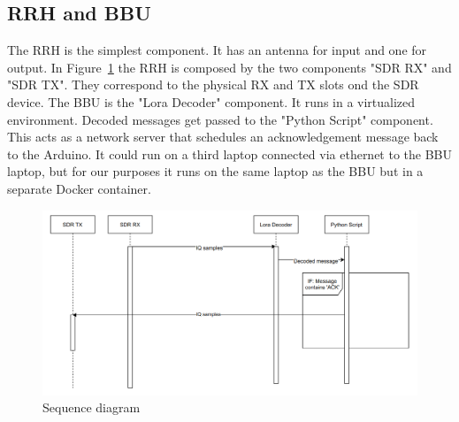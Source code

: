\subsection{RRH and BBU}
The RRH is the simplest component. It has an antenna for input and one for output. In Figure~\ref{fig:seq_diagram} the RRH is composed by the two 
components "SDR RX" and "SDR TX". They correspond to the physical RX and TX slots ond the SDR device. The BBU is the "Lora Decoder" component. It runs 
in a virtualized environment. Decoded messages get passed to the "Python Script" component. This acts as a network server that schedules an acknowledgement
message back to the Arduino. It could run on a third laptop connected via ethernet to the BBU laptop, but for our purposes it runs on the same laptop
as the BBU but in a separate Docker container.
\begin{figure}[h]
    \centering
    \includegraphics[width=1\textwidth]{figures/seq_diagram.png}
    \caption{Sequence diagram}
    \label{fig:seq_diagram}
\end{figure}


